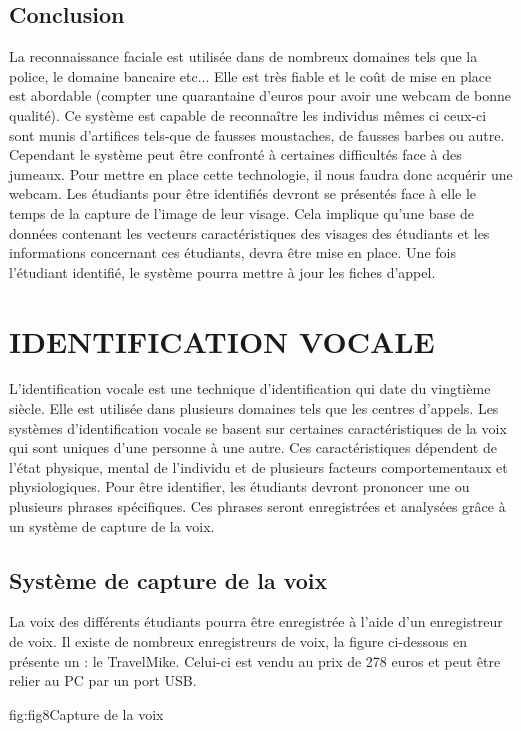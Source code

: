 \documentclass[overfullbox]{polytech/polytech}
\begin{document}
\subsection{Conclusion}
La reconnaissance faciale est utilisée dans de nombreux domaines tels que la police, le domaine bancaire etc... Elle est très fiable et le coût de mise en place est abordable (compter une quarantaine d'euros  pour avoir une webcam de bonne qualité). Ce système est capable de reconnaître les individus mêmes ci ceux-ci sont munis d'artifices tels-que de fausses moustaches, de fausses barbes ou autre.  Cependant le système peut être confronté à certaines difficultés face à des jumeaux. Pour mettre en place cette technologie, il nous faudra donc acquérir une webcam. Les étudiants pour être identifiés devront se présentés face à elle le temps de la capture de l'image de leur visage. Cela implique qu'une base de données contenant les vecteurs caractéristiques des visages des étudiants et les informations concernant ces étudiants, devra être mise en place. Une fois l'étudiant identifié, le système pourra mettre à jour les fiches d'appel.

 
\section{IDENTIFICATION VOCALE}
L'identification vocale est une technique d'identification qui date du vingtième siècle. Elle est utilisée dans plusieurs domaines tels que les centres d'appels. Les systèmes d'identification vocale se basent sur certaines caractéristiques de la voix qui sont uniques d'une personne à une autre. Ces caractéristiques dépendent de l'état physique, mental de l'individu et de plusieurs facteurs comportementaux et physiologiques. Pour être identifier, les étudiants devront prononcer une ou plusieurs phrases spécifiques. Ces phrases seront enregistrées et analysées grâce à un système de capture de la voix.

\subsection{Système de capture de la voix}
La voix des différents étudiants pourra être enregistrée à l'aide d'un enregistreur de voix. Il existe de nombreux enregistreurs de voix, la figure ci-dessous en présente un : le TravelMike. Celui-ci est vendu au prix de 278 euros et peut être relier au PC par un port USB.


\begin{Figure}{fig:fig8}{Capture de la voix}
\end{Figure}
 
\end{document}
